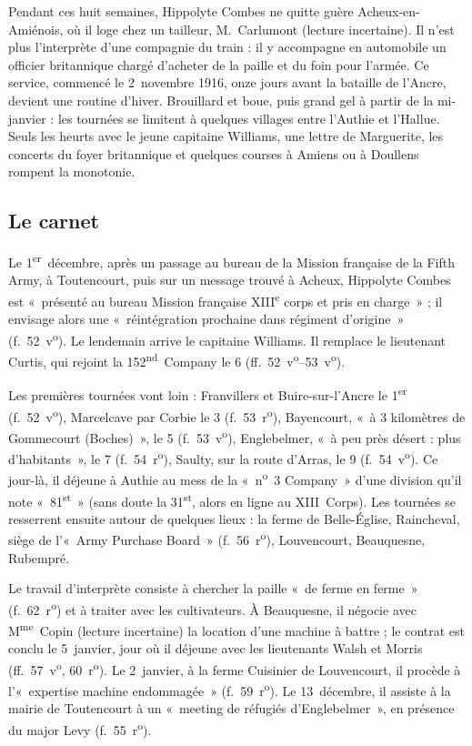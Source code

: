 Pendant ces huit semaines, Hippolyte Combes ne quitte guère Acheux-en-Amiénois, où il loge chez un tailleur, M.~Carlumont (lecture incertaine). Il n'est plus l'interprète d'une compagnie du train : il y accompagne en automobile un officier britannique chargé d'acheter de la paille et du foin pour l'armée. Ce service, commencé le 2~novembre 1916, onze jours avant la bataille de l'Ancre, devient une routine d'hiver. Brouillard et boue, puis grand gel à partir de la mi-janvier : les tournées se limitent à quelques villages entre l'Authie et l'Hallue. Seuls les heurts avec le jeune capitaine Williams, une lettre de Marguerite, les concerts du foyer britannique et quelques courses à Amiens ou à Doullens rompent la monotonie.

\subsection*{Le carnet}

Le 1\textsuperscript{er}~décembre, après un passage au bureau de la Mission française de la Fifth Army, à Toutencourt, puis sur un message trouvé à Acheux, Hippolyte Combes est «~présenté au bureau Mission française XIII\textsuperscript{e} corps et pris en charge~» ; il envisage alors une «~réintégration prochaine dans régiment d'origine~» (f.~52~v\textsuperscript{o}). Le lendemain arrive le capitaine Williams. Il remplace le lieutenant Curtis, qui rejoint la 152\textsuperscript{nd}~Company le 6 (ff.~52~v\textsuperscript{o}--53~v\textsuperscript{o}).

Les premières tournées vont loin : Franvillers et Buire-sur-l'Ancre le 1\textsuperscript{er} (f.~52~v\textsuperscript{o}), Marcelcave par Corbie le 3 (f.~53~r\textsuperscript{o}), Bayencourt, «~à 3 kilomètres de Gommecourt (Boches)~», le 5 (f.~53~v\textsuperscript{o}), Englebelmer, «~à peu près désert : plus d'habitants~», le 7 (f.~54~r\textsuperscript{o}), Saulty, sur la route d'Arras, le 9 (f.~54~v\textsuperscript{o}). Ce jour-là, il déjeune à Authie au mess de la «~n\textsuperscript{o}~3 Company~» d'une division qu'il note «~81\textsuperscript{st}~» (sans doute la 31\textsuperscript{st}, alors en ligne au XIII~Corps). Les tournées se resserrent ensuite autour de quelques lieux : la ferme de Belle-Église, Raincheval, siège de l'«~Army Purchase Board~» (f.~56~r\textsuperscript{o}), Louvencourt, Beauquesne, Rubempré.

Le travail d'interprète consiste à chercher la paille «~de ferme en ferme~» (f.~62~r\textsuperscript{o}) et à traiter avec les cultivateurs. À Beauquesne, il négocie avec M\textsuperscript{me}~Copin (lecture incertaine) la location d'une machine à battre ; le contrat est conclu le 5~janvier, jour où il déjeune avec les lieutenants Walsh et Morris (ff.~57~v\textsuperscript{o}, 60~r\textsuperscript{o}). Le 2~janvier, à la ferme Cuisinier de Louvencourt, il procède à l'«~expertise machine endommagée~» (f.~59~r\textsuperscript{o}). Le 13~décembre, il assiste à la mairie de Toutencourt à un «~meeting de réfugiés d'Englebelmer~», en présence du major Levy (f.~55~r\textsuperscript{o}).

